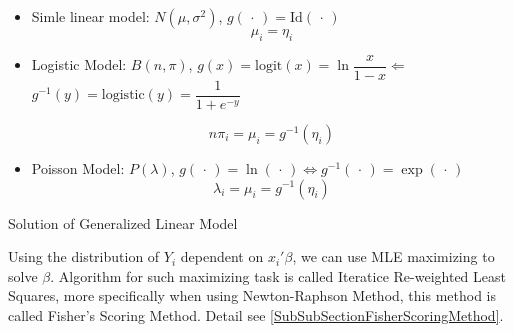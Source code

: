 \begin{itemize}[topsep=2pt,itemsep=0pt]
    \item Simle linear model: $ N(\mu ,\sigma ^2) $, $ g(\,\cdot\,)=\mathrm{Id}(\,\cdot\,) $
    \begin{equation}
        \mu _i=\eta_i
    \end{equation}
    \item Logistic Model: $ B(n,\pi) $, $ g(x)=\mathrm{logit}(x)=\ln\dfrac{x}{1-x}\Leftarrow   $$ g^{-1}(y)=\mathrm{logistic}(y)=\dfrac{1}{1+e^{-y}}  $
    
    \begin{equation}
        n\pi_i=\mu _i=g^{-1}(\eta_i) 
    \end{equation}
    
    \item Poisson Model: $ P(\lambda ) $, $ g(\,\cdot\,)=\ln(\,\cdot\,)\Leftrightarrow g^{-1}(\,\cdot\,)=\exp(\,\cdot\,)  $
    \begin{equation}
        \lambda _i=\mu_i=g^{-1}(\eta_i) 
    \end{equation}
    
    
\end{itemize}

    
\begin{point}
    Solution of Generalized Linear Model
\end{point}

    Using the distribution of $ Y_i $ dependent on $ x_i'\beta  $, we can use MLE maximizing to solve $ \beta  $. Algorithm for such maximizing task is called Iteratice Re-weighted Least Squares, more specifically when using Newton-Raphson Method, this method is called Fisher's Scoring Method. Detail see \autoref{SubSubSectionFisherScoringMethod}.



    



















    
